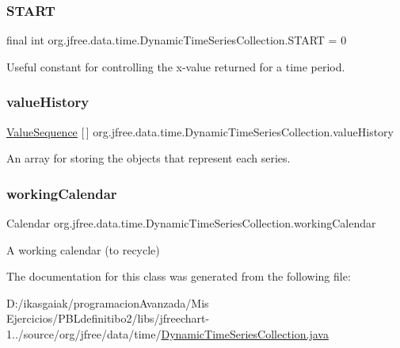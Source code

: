 \subsubsection{\texorpdfstring{S\+T\+A\+RT}{START}}
{\footnotesize\ttfamily final int org.\+jfree.\+data.\+time.\+Dynamic\+Time\+Series\+Collection.\+S\+T\+A\+RT = 0\hspace{0.3cm}{\ttfamily [static]}}

Useful constant for controlling the x-\/value returned for a time period. \mbox{\label{classorg_1_1jfree_1_1data_1_1time_1_1_dynamic_time_series_collection_a3823ae6f83ca54d5e730fb82b7eb17f7}} 
\subsubsection{\texorpdfstring{value\+History}{valueHistory}}
{\footnotesize\ttfamily \mbox{\hyperlink{classorg_1_1jfree_1_1data_1_1time_1_1_dynamic_time_series_collection_1_1_value_sequence}{Value\+Sequence}} \mbox{[}$\,$\mbox{]} org.\+jfree.\+data.\+time.\+Dynamic\+Time\+Series\+Collection.\+value\+History\hspace{0.3cm}{\ttfamily [protected]}}

An array for storing the objects that represent each series. \mbox{\label{classorg_1_1jfree_1_1data_1_1time_1_1_dynamic_time_series_collection_a3cabbbf6b6524b3a5acd9e55f085ca15}} 
\subsubsection{\texorpdfstring{working\+Calendar}{workingCalendar}}
{\footnotesize\ttfamily Calendar org.\+jfree.\+data.\+time.\+Dynamic\+Time\+Series\+Collection.\+working\+Calendar\hspace{0.3cm}{\ttfamily [protected]}}

A working calendar (to recycle) 

The documentation for this class was generated from the following file\+:\begin{DoxyCompactItemize}
\item 
D\+:/ikasgaiak/programacion\+Avanzada/\+Mis Ejercicios/\+P\+B\+Ldefinitibo2/libs/jfreechart-\/1../source/org/jfree/data/time/\mbox{\hyperlink{_dynamic_time_series_collection_8java}{Dynamic\+Time\+Series\+Collection.\+java}}\end{DoxyCompactItemize}
